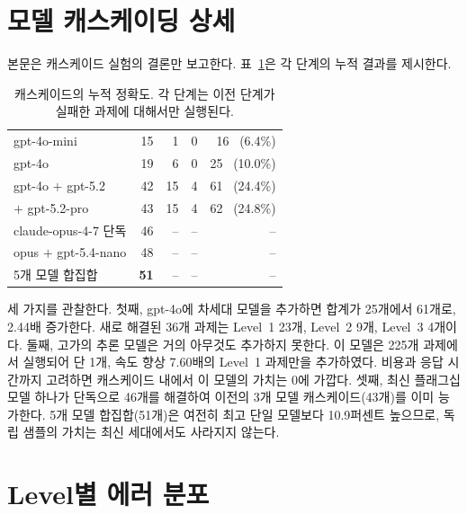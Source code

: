 \section{모델 캐스케이딩 상세}

본문은 캐스케이드 실험의 결론만 보고한다. 표~\ref{tab:cascading}은 각 단계의 누적 결과를
제시한다.

\begin{table}[h]
\centering
\small
\setlength{\tabcolsep}{4pt}
\caption{캐스케이드의 누적 정확도. 각 단계는 이전 단계가 실패한 과제에 대해서만
실행된다.}
\label{tab:cascading}
\begin{tabular}{@{}lrrrr@{}}
\toprule
\headrow{구성} & \headrow{L1} & \headrow{L2} & \headrow{L3} & \headrow{합계 (/250)} \\
\midrule
gpt-4o-mini            & 15 & 1  & 0 & 16 \ (6.4\%) \\
gpt-4o                 & 19 & 6  & 0 & 25 \ (10.0\%) \\
gpt-4o $+$ gpt-5.2     & 42 & 15 & 4 & 61 \ (24.4\%) \\
\quad $+$ gpt-5.2-pro  & 43 & 15 & 4 & 62 \ (24.8\%) \\
\midrule
claude-opus-4-7 단독   & 46 & -- & -- & -- \\
opus $+$ gpt-5.4-nano  & 48 & -- & -- & -- \\
5개 모델 합집합        & \textbf{51} & -- & -- & -- \\
\bottomrule
\end{tabular}
\end{table}

세 가지를 관찰한다. 첫째, gpt-4o에 차세대 모델을 추가하면 합계가 25개에서 61개로, 2.44배
증가한다. 새로 해결된 36개 과제는 Level~1 23개, Level~2 9개, Level~3 4개이다. 둘째, 고가의
추론 모델은 거의 아무것도 추가하지 못한다. 이 모델은 225개 과제에서 실행되어 단 1개, 속도 향상
7.60배의 Level~1 과제만을 추가하였다. 비용과 응답 시간까지 고려하면 캐스케이드 내에서 이 모델의
가치는 0에 가깝다. 셋째, 최신 플래그십 모델 하나가 단독으로 46개를 해결하여 이전의 3개 모델
캐스케이드(43개)를 이미 능가한다. 5개 모델 합집합(51개)은 여전히 최고 단일 모델보다 10.9퍼센트
높으므로, 독립 샘플의 가치는 최신 세대에서도 사라지지 않는다.

\section{Level별 에러 분포}

